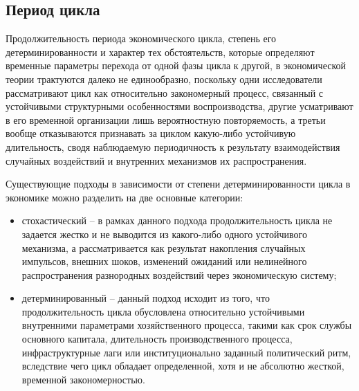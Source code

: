 \subsection{Период цикла} %
Продолжительность периода экономического цикла, степень его детерминированности и характер тех обстоятельств, которые определяют временные параметры перехода от одной фазы цикла к другой, в экономической теории трактуются далеко не единообразно, поскольку одни исследователи рассматривают цикл как относительно закономерный процесс, связанный с устойчивыми структурными особенностями воспроизводства, другие усматривают в его временной организации лишь вероятностную повторяемость, а третьи вообще отказываются признавать за циклом какую-либо устойчивую длительность, сводя наблюдаемую периодичность к результату взаимодействия случайных воздействий и внутренних механизмов их распространения.

Существующие подходы в зависимости от степени детерминированности цикла в экономике можно разделить на две основные категории:
\begin{itemize}
    \item стохастический – в рамках данного подхода продолжительность цикла не задается жестко и не выводится из какого-либо одного устойчивого механизма, а рассматривается как результат накопления случайных импульсов, внешних шоков, изменений ожиданий или нелинейного распространения разнородных воздействий через экономическую систему;
    \item детерминированный – данный подход исходит из того, что продолжительность цикла обусловлена относительно устойчивыми внутренними параметрами хозяйственного процесса, такими как срок службы основного капитала, длительность производственного процесса, инфраструктурные лаги или институционально заданный политический ритм, вследствие чего цикл обладает определенной, хотя и не абсолютно жесткой, временной закономерностью.
\end{itemize}

